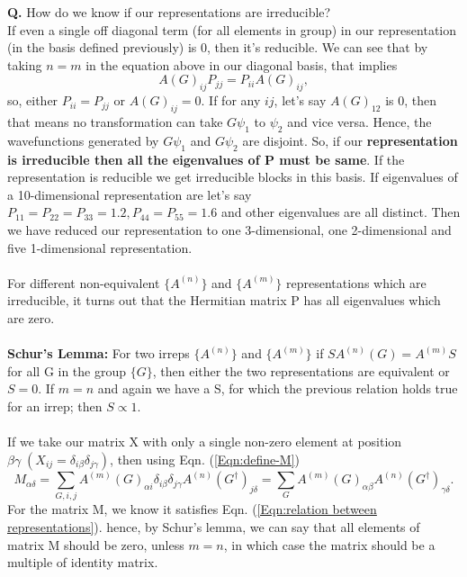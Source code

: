 \documentclass{article}
\begin{document}
	\textbf{Q.} How do we know if our representations are irreducible?\\
	If even a single off diagonal term (for all elements in group) in our representation (in the basis defined previously) is 0, then it's reducible. We can see that by taking $n=m$ in the equation above in our diagonal basis, that implies
	\begin{equation}
		A(G)_{ij}P_{jj} = P_{ii} A(G)_{ij},
	\end{equation}
	so, either $P_{ii} = P_{jj}$ or $A(G)_{ij} = 0$. If for any $ij$, let's say $A(G)_{12}$ is 0, then that means no transformation can take $G\psi_1$ to $\psi_2$ and vice versa. Hence, the wavefunctions generated by $G\psi_1$ and $G\psi_2$ are disjoint. So, if our \textbf{representation is irreducible then all the eigenvalues of P must be same}. If the representation is reducible we get irreducible blocks in this basis. If eigenvalues of a 10-dimensional representation are let's say $P_{11} = P_{22} = P_{33} = 1.2, P_{44} = P_{55} = 1.6$ and other eigenvalues are all distinct. Then we have reduced our representation to one 3-dimensional, one 2-dimensional and five 1-dimensional representation.\\\\
	For different non-equivalent  $\{A^{(n)}\}$ and $\{A^{(m)}\}$ representations which are irreducible, it turns out that the Hermitian matrix P has all eigenvalues which are zero.\\ \\
	\textbf{Schur's Lemma:} For two irreps $\{A^{(n)}\}$ and $\{A^{(m)}\}$ if $S A^{(n)}(G) = A^{(m)} S$ for all G in the group $\{G\}$, then either the two representations are equivalent or $S = 0$. If $m = n$ and again we have a S, for which the previous relation holds true for an irrep; then $S \propto 1$.\\\\
	If we take our matrix X with only a single non-zero element at position $\beta \gamma \;(X_{ij} = \delta_{i\beta}\delta_{j\gamma})$, then using Eqn. (\ref{Eqn:define-M})
	\begin{equation}
		M_{\alpha \delta} = \sum_{G,i,j}A^{(m)}(G)_{\alpha i} \delta_{i\beta}\delta_{j\gamma} A^{(n)}(G^\dagger)_{j \delta} = \sum_{G}A^{(m)}(G)_{\alpha \beta}  A^{(n)}(G^\dagger)_{\gamma \delta}.
	\end{equation}
	For the matrix M, we know it satisfies Eqn. (\ref{Eqn:relation between representations}). hence, by Schur's lemma, we can say that all elements of matrix M should be zero, unless $m=n$, in which case the matrix should be a multiple of identity matrix.
\end{document}
